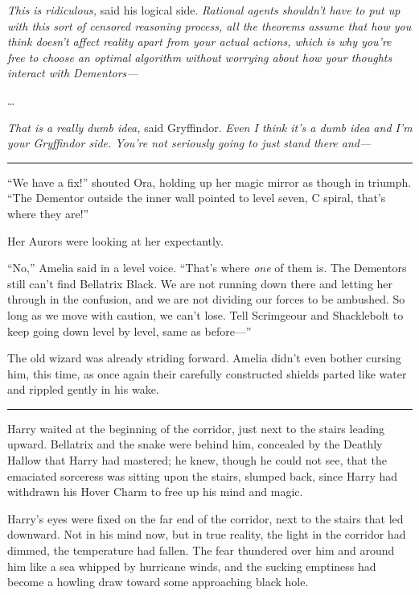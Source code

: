\emph{This is ridiculous,} said his logical side. \emph{Rational agents
shouldn't have to put up with this sort of censored reasoning process,
all the theorems assume that how you think doesn't affect reality apart
from your actual actions, which is why you're free to choose an optimal
algorithm without worrying about how your thoughts interact with
Dementors---}

\ldots{}

\emph{That is a really dumb idea,} said Gryffindor. \emph{Even I think
it's a dumb idea and I'm your Gryffindor side. You're not seriously
going to just stand there and---}

\begin{center}\rule{3in}{0.4pt}\end{center}

``We have a fix!'' shouted Ora, holding up her magic mirror as though in
triumph. ``The Dementor outside the inner wall pointed to level seven, C
spiral, that's where they are!''

Her Aurors were looking at her expectantly.

``No,'' Amelia said in a level voice. ``That's where \emph{one} of them
is. The Dementors still can't find Bellatrix Black. We are not running
down there and letting her through in the confusion, and we are not
dividing our forces to be ambushed. So long as we move with caution, we
can't lose. Tell Scrimgeour and Shacklebolt to keep going down level by
level, same as before---''

The old wizard was already striding forward. Amelia didn't even bother
cursing him, this time, as once again their carefully constructed
shields parted like water and rippled gently in his wake.

\begin{center}\rule{3in}{0.4pt}\end{center}

Harry waited at the beginning of the corridor, just next to the stairs
leading upward. Bellatrix and the snake were behind him, concealed by
the Deathly Hallow that Harry had mastered; he knew, though he could not
see, that the emaciated sorceress was sitting upon the stairs, slumped
back, since Harry had withdrawn his Hover Charm to free up his mind and
magic.

Harry's eyes were fixed on the far end of the corridor, next to the
stairs that led downward. Not in his mind now, but in true reality, the
light in the corridor had dimmed, the temperature had fallen. The fear
thundered over him and around him like a sea whipped by hurricane winds,
and the sucking emptiness had become a howling draw toward some
approaching black hole.

